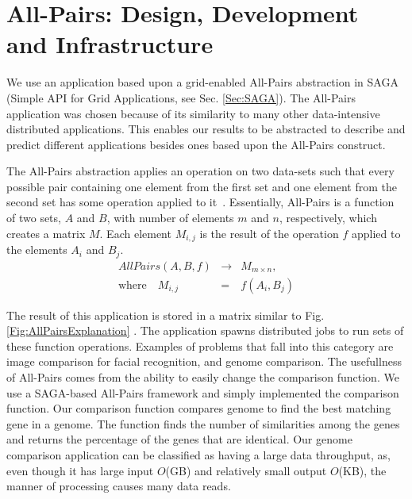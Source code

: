 \documentclass{rspublic}
\begin{document}
\section{All-Pairs: Design, Development and Infrastructure} We use an
application based upon a grid-enabled All-Pairs abstraction in SAGA
(Simple API for Grid Applications, see Sec. \ref{Sec:SAGA}). The
All-Pairs application was chosen because of its similarity to many
other data-intensive distributed applications. This enables our
results to be abstracted to describe and predict different
applications besides ones based upon the All-Pairs construct. 

The All-Pairs abstraction applies an operation on two data-sets such that every
possible pair containing one element from the first set and one
element from the second set has some operation applied to
it~\citep{AllPairs}. Essentially, All-Pairs is a function of
two sets, $A$ and $B$, with number of elements $m$ and $n$,
respectively, which creates a matrix $M$. Each element $M_{i,j}$ is
the result of the operation $f$ applied to the elements $A_i$ and
$B_j$.
\begin{eqnarray}
 AllPairs(A, B, f) & \rightarrow & M_{m \times n}, \\
\mbox{where} \quad M_{i,j} & = & f(A_{i},B_{j})
 \end{eqnarray}

 The result of this application is stored in a matrix similar to Fig.
 \ref{Fig:AllPairsExplanation} . The application spawns distributed
 jobs to run sets of these function operations. Examples of problems
 that fall into this category are image comparison for facial
 recognition, and genome comparison.  The usefullness of All-Pairs
 comes from the ability to easily change the comparison function.  We
 use a SAGA-based All-Pairs framework and simply implemented the
 comparison function.  Our comparison function compares genome to find
 the best matching gene in a genome.  The function finds the number of
 similarities among the genes and returns the percentage of the genes
 that are identical. Our genome comparison application can be
 classified as having a large data throughput, as, even though it has
 large input $O$(GB) and relatively small output $O$(KB), the manner
 of processing causes many data reads.
\end{document}
